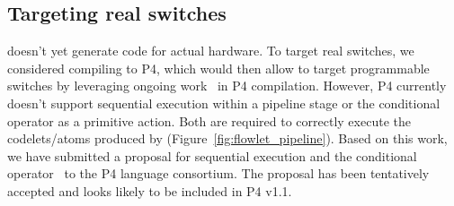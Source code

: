 \subsection{Targeting real switches}
\label{ss:real}
\pktlanguage doesn't yet generate code for actual hardware. To target real
switches, we considered compiling \pktlanguage to P4, which would then allow
\pktlanguage to target programmable switches by leveraging ongoing
work~\cite{netronome, xilinx,lavanya_compiler} in P4 compilation. However, P4
currently doesn't support sequential execution within a pipeline stage or the
conditional operator as a primitive action. Both are required to correctly
execute the codelets/atoms produced by \pktlanguage
(Figure~\ref{fig:flowlet_pipeline}). Based on this work, we have submitted a
proposal for sequential execution and the conditional
operator~\cite{p4-semantics} to the P4 language consortium. The proposal has
been tentatively accepted and looks likely to be included in P4 v1.1.
